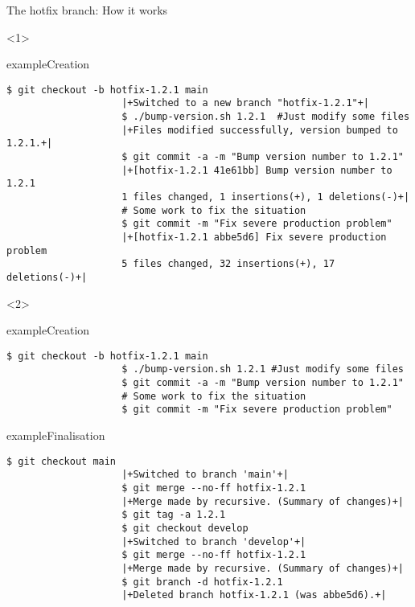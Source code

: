 \documentclass[usenames,svgnames,14pt]{beamer}
\begin{document}
\begin{frame}[fragile,c]{The hotfix branch: How it works}
    \vspace{-13mm}
    \begin{overlayarea}{\textwidth}{0.8\textheight}
        \begin{onlyenv}<1>
            \begin{varblock}{example}{Creation}
                \begin{lstlisting}[style=MyBash]
                    $ git checkout -b hotfix-1.2.1 main
                    |+Switched to a new branch "hotfix-1.2.1"+|
                    $ ./bump-version.sh 1.2.1  #Just modify some files
                    |+Files modified successfully, version bumped to 1.2.1.+|
                    $ git commit -a -m "Bump version number to 1.2.1"
                    |+[hotfix-1.2.1 41e61bb] Bump version number to 1.2.1
                    1 files changed, 1 insertions(+), 1 deletions(-)+|
                    # Some work to fix the situation
                    $ git commit -m "Fix severe production problem"
                    |+[hotfix-1.2.1 abbe5d6] Fix severe production problem
                    5 files changed, 32 insertions(+), 17 deletions(-)+|
                \end{lstlisting}
            \end{varblock}
        \end{onlyenv}
        \begin{onlyenv}<2>
            \begin{varblock}{example}{Creation}
                \begin{lstlisting}[style=MyBash]
                    $ git checkout -b hotfix-1.2.1 main
                    $ ./bump-version.sh 1.2.1 #Just modify some files
                    $ git commit -a -m "Bump version number to 1.2.1"
                    # Some work to fix the situation
                    $ git commit -m "Fix severe production problem"
                \end{lstlisting}
            \end{varblock}
            \vspace{-3mm}
            \begin{varblock}{example}{Finalisation}
                \begin{lstlisting}[style=MyBash]
                    $ git checkout main
                    |+Switched to branch 'main'+|
                    $ git merge --no-ff hotfix-1.2.1
                    |+Merge made by recursive. (Summary of changes)+|
                    $ git tag -a 1.2.1
                    $ git checkout develop
                    |+Switched to branch 'develop'+|
                    $ git merge --no-ff hotfix-1.2.1
                    |+Merge made by recursive. (Summary of changes)+|
                    $ git branch -d hotfix-1.2.1
                    |+Deleted branch hotfix-1.2.1 (was abbe5d6).+|
                \end{lstlisting}
            \end{varblock}
        \end{onlyenv}
    \end{overlayarea}
\end{frame}
\end{document}
